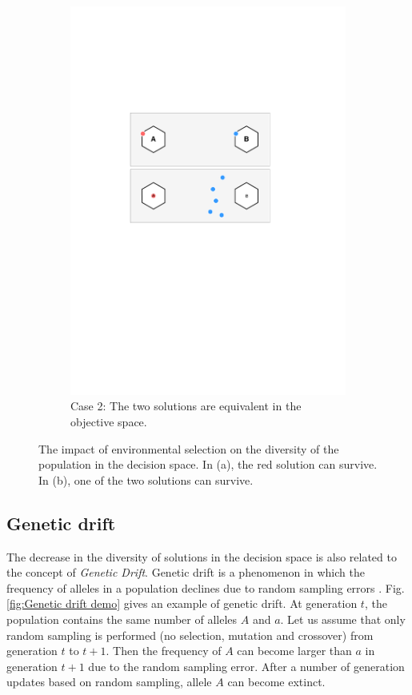 \documentclass[conference]{IEEEtran}
\begin{document}
\begin{figure}[t!]
	\begin{subfigure}[b]{.3\textwidth}
		\includegraphics[width=\linewidth]{Section3/case2}
		\caption{Case 2: The two solutions are equivalent in the objective space.}
	\end{subfigure}
	\caption{The impact of environmental selection on the diversity of the population in the decision space. In (a), the red solution can survive. In (b), one of the two solutions can survive. }
	\label{fig: Environmental selection}
\end{figure}

\subsection{Genetic drift}
The decrease in the diversity of solutions in the decision space is also related to the concept of \textit{Genetic Drift}. Genetic drift is a phenomenon in which the frequency of alleles in a population declines due to random sampling errors \cite{muhlenbein1993predictive}. Fig. \ref{fig:Genetic drift demo} gives an example of genetic drift. At generation $t$, the population contains the same number of alleles $A$ and $a$. Let us assume that only random sampling is performed (no selection, mutation and crossover) from generation $t$ to $t+1$. Then the frequency of $A$ can become larger than $a$ in generation $t+1$ due to the random sampling error. After a number of generation updates based on random sampling, allele $A$ can become extinct.
\end{document}
